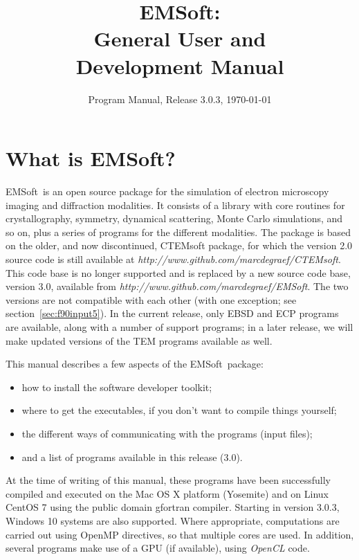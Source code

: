 \documentclass[DIV=calc, paper=letter, fontsize=11pt]{scrartcl}	 %
\title{EMSoft:\\ General User and\\ Development Manual} %
\author{\vspace*{-0.7in}} %
\date{Program Manual, Release 3.0.3, \today}
\newcommand{\ctp}{\textsf{EMSoft}}
\newcommand{\ctpb}{\textbf{\textsf{EMSoft}}}
\begin{document}
\maketitle

\renewcommand{\contentsname}{Table of Contents}
{\small\tableofcontents}

\newpage
\section{What is \ctpb?}
\ctp\ is an open source package for the simulation of electron microscopy imaging and diffraction modalities.  It consists of a library with
core routines for crystallography, symmetry, dynamical scattering, Monte Carlo simulations, and so on, plus a series of programs for the different modalities.
The package is based on the older, and now discontinued, \textsf{CTEMsoft} package, for which the version 2.0 source code is still
available at \textit{http://www.github.com/marcdegraef/CTEMsoft}.  This code base is no longer supported and is replaced
by a new source code base, version 3.0, available from \textit{http://www.github.com/marcdegraef/EMSoft}.  The two versions are not 
compatible with each other (with one exception; see section~\ref{sec:f90input5}).  In the current release, only EBSD and ECP programs are
available, along with a number of support programs; in a later release, we will make updated versions of the TEM programs available as well.

This manual describes a few aspects of the \ctp\ package:
\begin{itemize}
\item how to install the software developer toolkit;
\item where to get the executables, if you don't want to compile things yourself;
\item the different ways of communicating with the programs (input files);
\item and a list of programs available in this release (3.0).
\end{itemize}

At the time of writing of this manual, these programs have been successfully compiled and executed on the Mac OS X platform (Yosemite) and on 
Linux CentOS 7 using the public domain gfortran compiler. Starting in version 3.0.3, Windows 10 systems are also supported.
Where appropriate, computations are carried out using \textsf{OpenMP} directives, so that multiple cores are used.  In addition, several programs make use of a 
GPU (if available), using \textit{OpenCL} code.
\end{document}
